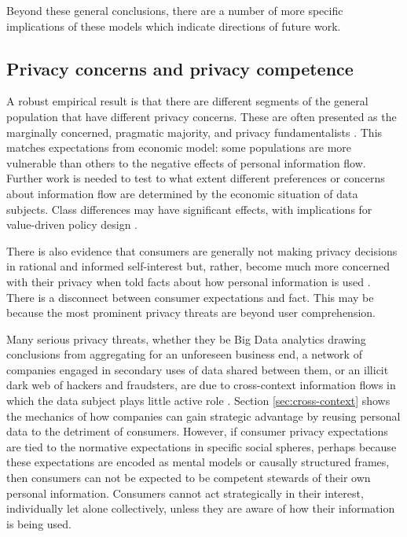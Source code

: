\documentclass[../thesis.tex]{subfiles}
\begin{document}
Beyond these general conclusions, there are a number
of more specific implications of these models which
indicate directions of future work.

\subsection{Privacy concerns and privacy competence}

A robust empirical result is that there are
different segments of the general population that have different
privacy concerns.
These are often presented as the marginally concerned, pragmatic majority,
and privacy fundamentalists \cite{ackerman1999privacy}
\cite{berendt2005privacy} \cite{sheehan2002toward}.
This matches expectations from economic model:
some populations are more vulnerable than others to the
negative effects of personal information flow.
Further work is needed to test to what extent
different preferences or concerns about information
flow are determined by the economic situation
of data subjects.
Class differences may have significant effects,
with implications for value-driven policy design
\cite{madden2017privacy}.

There is also evidence that consumers are generally not making
privacy decisions in rational and informed
self-interest but, rather,
become much more concerned with their privacy
when told facts
about how personal information is
used \cite{hoofnagle2014alan}.
There is a disconnect between consumer
expectations and fact.
This may be because the most prominent
privacy threats are beyond user comprehension.

Many serious privacy threats, whether they be Big
Data analytics drawing conclusions from
aggregating for an unforeseen business end,
a network of companies engaged in secondary uses of data
shared between them, or an illicit dark web of hackers
and fraudsters, are due to cross-context information
flows in which the data subject plays little active role
\cite{narayanan2012critical}.
Section \ref{sec:cross-context} shows the mechanics
of how companies can gain strategic advantage by
reusing personal data to the detriment of consumers.
However, if consumer privacy expectations are tied to
the normative expectations in specific social spheres,
perhaps because these expectations are encoded as mental
models or causally structured frames, then consumers
can not be expected to be competent stewards of their
own personal information.
Consumers cannot act strategically in their interest,
individually let alone collectively, unless they
are aware of how their information is being used.
\end{document}
